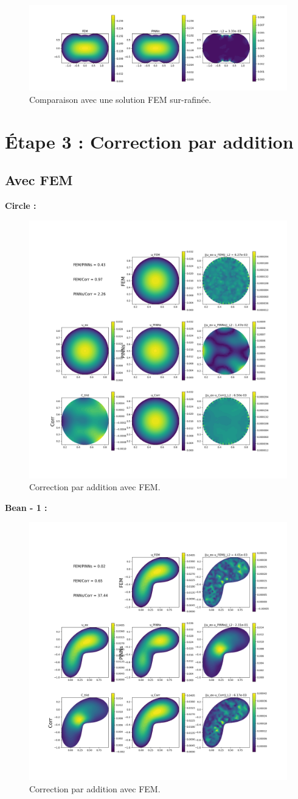 \documentclass[french]{article}
\begin{document}
	\begin{figure}[H]
		\centering
		\includegraphics[width=\linewidth]{"poisson/pumpkin/compare.png"}
		\caption{Comparaison avec une solution FEM sur-rafinée.}
	\end{figure}

	\newpage
	\section{Étape 3 : Correction par addition}
	
	\subsection{Avec FEM}
	
	\textbf{Circle :}
	
	\begin{figure}[H]
		\centering
		\includegraphics[width=0.55\linewidth]{"correction/circle/corr_FEM.png"}
		\caption{Correction par addition avec FEM.}
	\end{figure}
	
	\textbf{Bean - 1 :}
	
	\begin{figure}[H]
		\centering
		\includegraphics[width=0.55\linewidth]{"correction/bean/corr_FEM_1.png"}
		\caption{Correction par addition avec FEM.}
	\end{figure}
\end{document}
